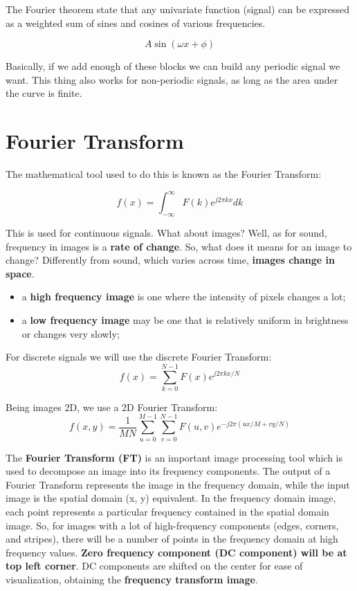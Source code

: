 \documentclass{article}
\begin{document}
The Fourier theorem state that any univariate function (signal) can be expressed as a weighted sum of sines and cosines of various frequencies. 

\begin{equation*}
    A \sin(\omega x + \phi) 
\end{equation*}

Basically, if we add enough of these blocks we can build any periodic signal we want. This thing also works for non-periodic signals, as long as the area under the curve is finite.

\section*{Fourier Transform}

The mathematical tool used to do this is known as the Fourier Transform:

\begin{equation*}
    f(x) = \int_{-\infty}^{\infty}F(k) e^{j2\pi kx}dk
\end{equation*}

This is used for continuous signals. What about images? Well, as for sound, frequency in images is a \textbf{rate of change}. So, what does it means for an image to change? Differently from sound, which varies across time, \textbf{images change in space}.

\begin{itemize}
    \item a \textbf{high frequency image} is one where the intensity of pixels changes a lot;
    \item a \textbf{low frequency image} may be one that is relatively uniform in brightness or changes very slowly;
\end{itemize}

\newpage

For discrete signals we will use the discrete Fourier Transform:
\begin{equation*}
    f(x) = \sum_{k=0}^{N-1} F(x) e^{j2\pi kx / N}
\end{equation*}

Being images 2D, we use a 2D Fourier Transform:
\begin{equation*}
    f(x,y) = \frac{1}{MN}\sum_{u=0}^{M-1} \sum_{v=0}^{N-1} F(u, v) e^{-j2\pi(ux/M + vy/N)}
\end{equation*}

The \textbf{Fourier Transform (FT)} is an important image processing tool which is used to decompose an image into its frequency components. The output of a Fourier Transform represents the image in the frequency domain, while the input image is the spatial domain (x, y) equivalent. In the frequency domain image, each point represents a particular frequency contained in the spatial domain image. So, for images with a lot of high-frequency components (edges, corners, and stripes), there will be a number of points in the frequency domain at high frequency values. \textbf{Zero frequency component (DC component) will be at top left corner}. DC components are shifted on the center for ease of visualization, obtaining the \textbf{frequency transform image}.\\ 
\end{document}
